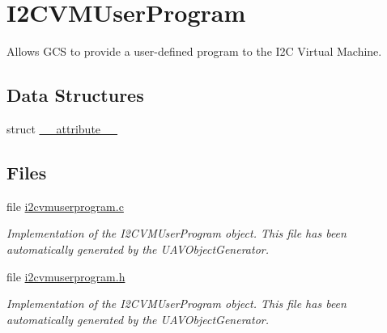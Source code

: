 \hypertarget{group___i2_c_v_m_user_program}{\section{\-I2\-C\-V\-M\-User\-Program}
\label{group___i2_c_v_m_user_program}
}


\-Allows \-G\-C\-S to provide a user-\/defined program to the \-I2\-C \-Virtual \-Machine.  


\subsection*{\-Data \-Structures}
\begin{DoxyCompactItemize}
\item 
struct \hyperlink{struct____attribute____}{\-\_\-\-\_\-attribute\-\_\-\-\_\-}
\end{DoxyCompactItemize}
\subsection*{\-Files}
\begin{DoxyCompactItemize}
\item 
file \hyperlink{i2cvmuserprogram_8c}{i2cvmuserprogram.\-c}
\begin{DoxyCompactList}\small\item\em \-Implementation of the \-I2\-C\-V\-M\-User\-Program object. \-This file has been automatically generated by the \-U\-A\-V\-Object\-Generator. \end{DoxyCompactList}\item 
file \hyperlink{i2cvmuserprogram_8h}{i2cvmuserprogram.\-h}
\begin{DoxyCompactList}\small\item\em \-Implementation of the \-I2\-C\-V\-M\-User\-Program object. \-This file has been automatically generated by the \-U\-A\-V\-Object\-Generator. \end{DoxyCompactList}\end{DoxyCompactItemize}
